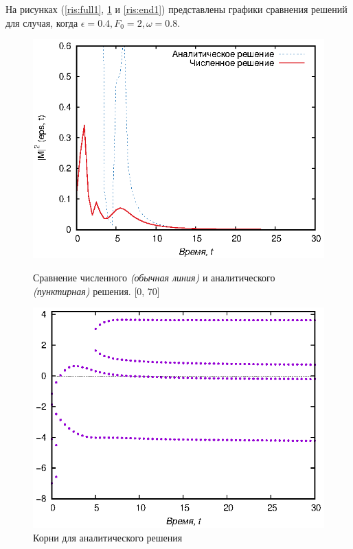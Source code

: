 \documentclass[14pt, a4paper]{article}
\numberwithin{figure}{section}
\numberwithin{equation}{section}
\begin{document}
На рисунках (\ref{ris:full1}, \ref{ris:rootsend1} и \ref{ris:end1}) представлены графики сравнения решений для случая, когда $\epsilon = 0.4, F_0 = 2, \omega = 0.8$.

\begin{figure}[h]
	\begin{center}
		\begin{minipage}[h]{0.45\linewidth}
			\includegraphics[width=1\linewidth]{full1}
			\caption{Сравнение численного \textit{(обычная линия)} и аналитического \textit{(пунктирная)} решения. [0, 70]} %
			\label{ris:full1} %
		\end{minipage}
		\hfill 
		\begin{minipage}[h]{0.45\linewidth}
			\includegraphics[width=1\linewidth]{rootsend1}
			\caption{Корни для аналитического решения }
			\label{ris:rootsend1}
		\end{minipage}
	\end{center}
\end{figure}
\end{document}
